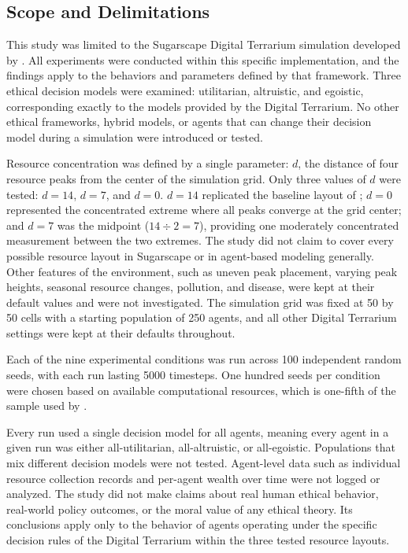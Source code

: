 \documentclass{icsthesis}
\begin{document}
\begin{mainmatter}
\subsection{Scope and Delimitations}
This study was limited to the Sugarscape Digital Terrarium simulation developed by \citet{KremerHerman2024}. All experiments were conducted within this specific implementation, and the findings apply to the behaviors and parameters defined by that framework. Three ethical decision models were examined: utilitarian, altruistic, and egoistic, corresponding exactly to the models provided by the Digital Terrarium. No other ethical frameworks, hybrid models, or agents that can change their decision model during a simulation were introduced or tested.

Resource concentration was defined by a single parameter: $d$, the distance of four resource peaks from the center of the simulation grid. Only three values of $d$ were tested: $d = 14$, $d = 7$, and $d = 0$. $d = 14$ replicated the baseline layout of \citet{KremerHerman2024}; $d = 0$ represented the concentrated extreme where all peaks converge at the grid center; and $d = 7$ was the midpoint ($14 \div 2 = 7$), providing one moderately concentrated measurement between the two extremes. The study did not claim to cover every possible resource layout in Sugarscape or in agent-based modeling generally. Other features of the environment, such as uneven peak placement, varying peak heights, seasonal resource changes, pollution, and disease, were kept at their default values and were not investigated. The simulation grid was fixed at 50 by 50 cells with a starting population of 250 agents, and all other Digital Terrarium settings were kept at their defaults throughout.

Each of the nine experimental conditions was run across 100 independent random seeds, with each run lasting 5000 timesteps. One hundred seeds per condition were chosen based on available computational resources, which is one-fifth of the sample used by \citet{KremerHerman2024}.

Every run used a single decision model for all agents, meaning every agent in a given run was either all-utilitarian, all-altruistic, or all-egoistic. Populations that mix different decision models were not tested. Agent-level data such as individual resource collection records and per-agent wealth over time were not logged or analyzed. The study did not make claims about real human ethical behavior, real-world policy outcomes, or the moral value of any ethical theory. Its conclusions apply only to the behavior of agents operating under the specific decision rules of the Digital Terrarium within the three tested resource layouts.


\end{mainmatter}
\end{document}
